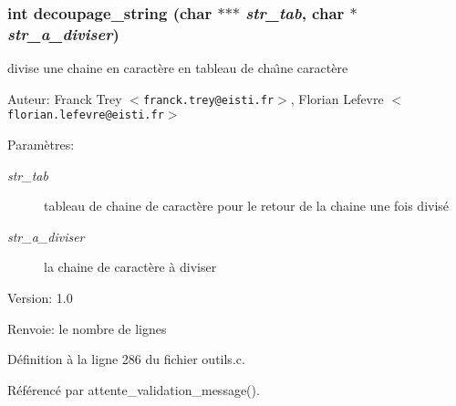 \subsubsection{\setlength{\rightskip}{0pt plus 5cm}int decoupage\_\-string (char $\ast$$\ast$$\ast$ {\em str\_\-tab}, char $\ast$ {\em str\_\-a\_\-diviser})}\label{outils_8c_6f12b97af4dd149267a5a423e3e5e7a7}


divise une chaine en caract\`{e}re en tableau de cha\^{\i}ne caract\`{e}re 

\begin{Desc}
\item[Auteur:]Franck Trey $<${\tt franck.trey@eisti.fr}$>$, Florian Lefevre $<${\tt florian.lefevre@eisti.fr}$>$\end{Desc}
\begin{Desc}
\item[Param\`{e}tres:]
\begin{description}
\item[{\em str\_\-tab}]tableau de chaine de caract\`{e}re pour le retour de la chaine une fois divis\'{e} \item[{\em str\_\-a\_\-diviser}]la chaine de caract\`{e}re \`{a} diviser\end{description}
\end{Desc}
\begin{Desc}
\item[Version:]1.0 \end{Desc}
\begin{Desc}
\item[Renvoie:]le nombre de lignes \end{Desc}


D\'{e}finition \`{a} la ligne 286 du fichier outils.c.

R\'{e}f\'{e}renc\'{e} par attente\_\-validation\_\-message().

